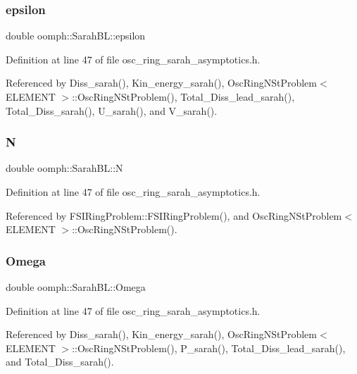 \mbox{\label{namespaceoomph_1_1SarahBL_a21bfe7e71f0baa62022d1ecc9bd175de}} 
\subsubsection{\texorpdfstring{epsilon}{epsilon}}
{\footnotesize\ttfamily double oomph\+::\+Sarah\+B\+L\+::epsilon}



Definition at line 47 of file osc\+\_\+ring\+\_\+sarah\+\_\+asymptotics.\+h.



Referenced by Diss\+\_\+sarah(), Kin\+\_\+energy\+\_\+sarah(), Osc\+Ring\+N\+St\+Problem$<$ E\+L\+E\+M\+E\+N\+T $>$\+::\+Osc\+Ring\+N\+St\+Problem(), Total\+\_\+\+Diss\+\_\+lead\+\_\+sarah(), Total\+\_\+\+Diss\+\_\+sarah(), U\+\_\+sarah(), and V\+\_\+sarah().

\mbox{\label{namespaceoomph_1_1SarahBL_a3f2e6fdba588e1883d317f6e0cd7f32f}} 
\subsubsection{\texorpdfstring{N}{N}}
{\footnotesize\ttfamily double oomph\+::\+Sarah\+B\+L\+::N}



Definition at line 47 of file osc\+\_\+ring\+\_\+sarah\+\_\+asymptotics.\+h.



Referenced by F\+S\+I\+Ring\+Problem\+::\+F\+S\+I\+Ring\+Problem(), and Osc\+Ring\+N\+St\+Problem$<$ E\+L\+E\+M\+E\+N\+T $>$\+::\+Osc\+Ring\+N\+St\+Problem().

\mbox{\label{namespaceoomph_1_1SarahBL_a370241de5869d0f53fc7cd17858bfbfe}} 
\subsubsection{\texorpdfstring{Omega}{Omega}}
{\footnotesize\ttfamily double oomph\+::\+Sarah\+B\+L\+::\+Omega}



Definition at line 47 of file osc\+\_\+ring\+\_\+sarah\+\_\+asymptotics.\+h.



Referenced by Diss\+\_\+sarah(), Kin\+\_\+energy\+\_\+sarah(), Osc\+Ring\+N\+St\+Problem$<$ E\+L\+E\+M\+E\+N\+T $>$\+::\+Osc\+Ring\+N\+St\+Problem(), P\+\_\+sarah(), Total\+\_\+\+Diss\+\_\+lead\+\_\+sarah(), and Total\+\_\+\+Diss\+\_\+sarah().


